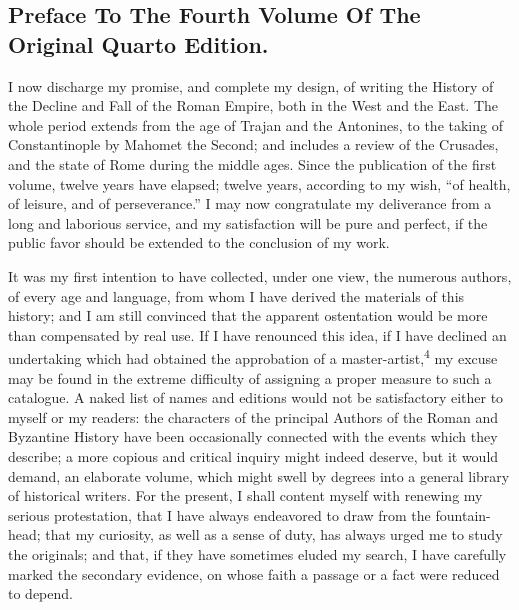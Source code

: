 \subsection{Preface To The Fourth Volume Of The Original Quarto Edition.}

I now discharge my promise, and complete my design, of writing the History
of the Decline and Fall of the Roman Empire, both in the West and the East.
The whole period extends from the age of Trajan and the Antonines, to the
taking of Constantinople by Mahomet the Second; and includes a review of the
Crusades, and the state of Rome during the middle ages. Since the publication
of the first volume, twelve years have elapsed; twelve years, according to my
wish, “of health, of leisure, and of perseverance.” I may now congratulate
my deliverance from a long and laborious service, and my satisfaction will be
pure and perfect, if the public favor should be extended to the conclusion
of my work.

It was my first intention to have collected, under one view, the numerous
authors, of every age and language, from whom I have derived the materials
of this history; and I am still convinced that the apparent ostentation would
be more than compensated by real use. If I have renounced this idea, if I
have declined an undertaking which had obtained the approbation of a
master-artist,\textsuperscript{4} my excuse may be found in the extreme difficulty
of assigning a proper measure to such a catalogue. A naked list of names and
editions would not be satisfactory either to myself or my readers: the
characters of the principal Authors of the Roman and Byzantine History have
been occasionally connected with the events which they describe; a more
copious and critical inquiry might indeed deserve, but it would demand, an
elaborate volume, which might swell by degrees into a general library of
historical writers. For the present, I shall content myself with renewing my
serious protestation, that I have always endeavored to draw from the
fountain-head; that my curiosity, as well as a sense of duty, has always urged
me to study the originals; and that, if they have sometimes eluded my search,
I have carefully marked the secondary evidence, on whose faith a passage or
a fact were reduced to depend.


